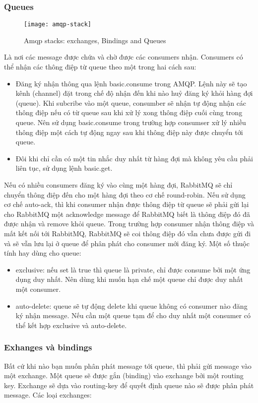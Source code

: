 \subsubsection{Queues}
\begin{figure}[h]
    \centering
    \texttt{[image: amqp-stack]}
    \caption{Amqp stacks: exchanges, Bindings and Queues}
    \label{fig:amqp-stack}
\end{figure}
Là nơi các message được chứa và chờ được các consumers nhận. Consumers có thể nhận các thông điệp từ queue theo một trong hai cách sau:
\begin{itemize}
	\item Đăng ký nhận thông qua lệnh basic.consume trong AMQP. Lệnh này sẽ tạo kênh (channel) đặt trong chế độ nhận đến khi nào huỷ đăng ký khỏi hàng đợi (queue). Khi subcribe vào một queue, consumber sẽ nhận tự động nhận các thông điệp nếu có từ queue sau khi xử lý xong thông điệp cuối cùng trong queue. Nên sử dụng basic.consume trong trường hợp consumser xử lý nhiều thông điệp một cách tự động ngay sau khi thông điệp này được chuyển tới queue.
	\item Đôi khi chỉ cần có một tin nhắc duy nhất từ hàng đợi mà không yêu cầu phải liên tục, sử dụng lệnh basic.get. 	
\end{itemize}
Nếu có nhiều consumers đăng ký vào cùng một hàng đợi, RabbitMQ sẽ chỉ chuyển thông điệp đến cho một hàng đợi theo cơ chế round-robin. 
\newline
Nếu sử dụng cơ chế auto-ack, thì khi consumer nhận được thông điệp từ queue sẽ phải gửi lại cho RabbitMQ một acknowledge message để  RabbitMQ biết là thông điệp đó đã được nhận và remove khỏi queue. Trong trường hợp consumer nhận thông điệp và mất kết nối tới RabbitMQ, RabbitMQ sẽ coi thông điệp đó vẫn chưa được gửi đi và sẽ vẫn lưu lại ở queue để phân phát cho consumer mới đăng ký.
\newline
Một số thuộc tính hay dùng cho queue:
\begin{itemize}
	\item exclusive: nếu set là true thì queue là private, chỉ được consume bởi một ứng dụng duy nhất. Nên dùng khi muốn hạn chế một queue chỉ được duy nhất một consumer.
	\item auto-delete: queue sẽ tự động delete khi queue không có consumer nào đăng ký nhận message. Nếu cần một queue tạm để cho duy nhất một consumer có thể kết hợp exclusive và auto-delete.
\end{itemize}

\subsubsection{Exhanges và bindings}
Bất cứ khi nào bạn muốn phân phát message tới queue, thì phải gửi message vào một exchange. Một queue sẽ được gắn (binding) vào exchange bởi một routing key. Exchange sẽ dựa vào routing-key để quyết định queue nào sẽ được phân phát message. Các loại exchanges: 

